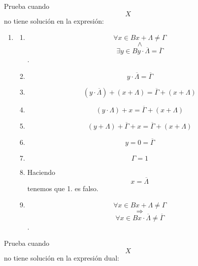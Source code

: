 \begin{enumerate}
\begin{enumerate}
\begin{enumerate}
\begin{enumerate}
\begin{enumerate}
          Prueba cuando \[X\] no tiene solución en la expresión:

          \begin{enumerate}
          \def\labelenumvi{\arabic{enumvi}.}
          \tightlist
          \item
            \begin{enumerate}
            \def\labelenumvii{\arabic{enumvii}.}
            \tightlist
            \item
              \[\forall{x \in B}{{x + \Lambda} \neq \Gamma}\]\[\land\]\[\exists{y \in B}{{y \cdot \overline{\Lambda}} = \overline{\Gamma}}\].
            \item
              \[{y \cdot \overline{\Lambda}} = \overline{\Gamma}\]
            \item
              \[{\left( {y \cdot \overline{\Lambda}} \right) + \left( {x + \Lambda} \right)} = {\overline{\Gamma} + \left( {x + \Lambda} \right)}\]
            \item
              \[{\left( {y \cdot \Lambda} \right) + x} = {\overline{\Gamma} + \left( {x + \Lambda} \right)}\]
            \item
              \[{{\left( {y + \Lambda} \right) + \overline{\Gamma}} + x} = {\overline{\Gamma} + \left( {x + \Lambda} \right)}\]
            \item
              \[{y = 0} = \overline{\Gamma}\]
            \item
              \[\Gamma = 1\]
            \item
              Haciendo \[x = \overline{\Lambda}\] tenemos que 1. es
              falso.
            \item
              \[\forall{x \in B}{{x + \Lambda} \neq \Gamma}\]\[\Rightarrow\]\[\forall{x \in B}{{x \cdot \overline{\Lambda}} \neq \overline{\Gamma}}\].
            \end{enumerate}
          \end{enumerate}

          Prueba cuando \[X\] no tiene solución en la expresión dual:


\end{enumerate}
\end{enumerate}
\end{enumerate}
\end{enumerate}
\end{enumerate}

